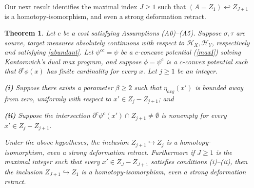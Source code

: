 \documentclass[12pt]{amsart}
\newtheorem{thm}{Theorem}
\theoremstyle{definition}
\newtheorem{dfn}{Definition}
\theoremstyle{remark}
\newcommand{\bR}{\mathbb{R}}
\newcommand{\del}{\partial}
\newcommand{\sub}{\del^c \psi^c(x')}
\newcommand{\hh}{\hookleftarrow}
\begin{document}


Our next result identifies the maximal index $J\geq 1$ such that $(A=Z_1) \hh Z_{J+1}$ is a homotopy-isomorphism, and even a strong deformation retract. 
\begin{thm}\label{B} 
Let $c$ be a cost satisfying Assumptions (A0)--(A5). Suppose $\sigma, \tau$ are source, target measures absolutely continuous with respect to $\mathscr{H}_X, \mathscr{H}_Y$, respectively and satisfying \eqref{abundant}. Let $\psi^{cc}=\psi$ be a $c$-concave potential (\ref{maxI}) solving Kantorovich's dual max program, and suppose $\phi=\psi^c$ is a $c$-convex potential such that $\del^c \phi(x)$ has finite cardinality for every $x$. Let $j\geq 1$ be an integer. 

\textbf{(i)} Suppose there exists a parameter $\beta\geq 2$ such that $\eta_{avg}(x')$  is bounded away from zero, uniformly with respect to $x' \in Z_j-Z_{j+1}$; and 

\textbf{(ii)} Suppose the intersection $\sub \cap Z_{j+1} \neq \emptyset$ is nonempty for every $x'\in Z_j-Z_{j+1}$. 

Under the above hypotheses, the inclusion $Z_{j+1} \hookrightarrow Z_j$ is a homotopy-isomorphism, even a strong deformation retract. Furthermore if $J\geq 1$ is the maximal integer such that every $x'\in Z_J-Z_{J+1}$ satisfies conditions (i)--(ii), then the inclusion $Z_{J+1} \hookrightarrow Z_1$ is a homotopy-isomorphism, even a strong deformation retract.
\end{thm}



\end{document}
